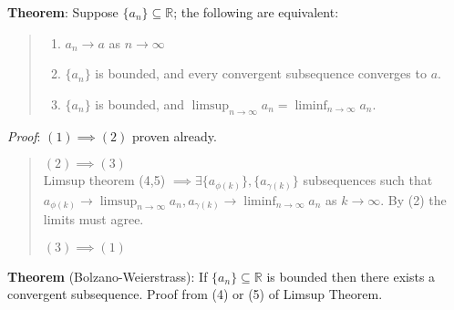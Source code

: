 \documentclass[11pt]{article}
\begin{document}
\textbf{Theorem}: Suppose $\{a_n\} \subseteq \mathbb{R}$; the following are equivalent:
\begin{quote}\vspace{-0.3cm}
	\begin{enumerate}
	\item $a_n \to a$ as $n \to \infty$
	\item $\{a_n\}$ is bounded, and every convergent subsequence converges to $a$.
	\item $\{a_n\}$ is bounded, and $\limsup_{n \to \infty} a_n = \liminf_{n \to \infty} a_n$.
	\end{enumerate}
\end{quote}
\emph{Proof}: $(1) \implies (2)$ proven already.
\begin{quote}\vspace{-0.3cm}
$(2) \implies (3)$\\
Limsup theorem (4,5) $\implies \exists \{a_{\phi(k)}\}, \{a_{\gamma(k)}\}$ subsequences such that $a_{\phi(k)} \to \limsup_{n \to \infty} a_n, a_{\gamma(k)} \to \liminf_{n \to \infty} a_n$ as $k \to \infty$. By (2) the limits must agree.

$(3) \implies (1)$\\

\end{quote}

\textbf{Theorem} (Bolzano-Weierstrass): If $\{a_n\} \subseteq \mathbb{R}$ is bounded then there exists a convergent subsequence. Proof from (4) or (5) of Limsup Theorem.
\end{document}
